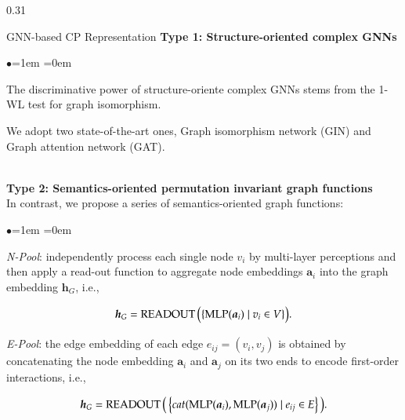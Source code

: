 \documentclass[serif,onlymath,final,xcolor=table]{beamer}
\begin{document}
\begin{frame}
\begin{columns}[t]
\begin{column}{0.31\linewidth}
\begin{block}{GNN-based CP Representation}
\textbf{Type 1: Structure-oriented complex GNNs}
\begin{list}{$\bullet$}{\leftmargin=1em \itemindent=0em}
\item The discriminative power of structure-oriente complex GNNs stems from the 1-WL test for graph isomorphism.
\item We adopt two state-of-the-art ones, Graph isomorphism network (GIN) and Graph attention network (GAT).
\end{list}
~\\
\textbf{Type 2: Semantics-oriented permutation invariant graph functions}\\
In contrast, we propose a series of semantics-oriented graph functions: 
\begin{list}{$\bullet$}{\leftmargin=1em \itemindent=0em}
    \item \textit{N-Pool}: independently process each single node $v_i$ by multi-layer perceptions and then apply a read-out function to aggregate node embeddings $\bm a_{i}$ into the graph embedding $\bm h_{G}$, i.e., 
    \begin{small}
    \begin{equation*}
    \setlength{\abovedisplayskip}{3pt}
    \setlength{\belowdisplayskip}{3pt}
    \bm h_{G}=\operatorname{READOUT}\Big( \{\operatorname{MLP}(\bm a_{i}) \mid v_i \in V \}\Big).
    \end{equation*}
    \end{small}
    \item \textit{E-Pool}: the edge embedding of each edge $e_{ij}=(v_i, v_j)$ is obtained by concatenating the node embedding $\bm a_{i}$ and $\bm a_{j}$ on its two ends to encode first-order interactions, i.e., 
    \begin{small}
    \begin{align*}
    \setlength{\abovedisplayskip}{3pt}
    \setlength{\belowdisplayskip}{3pt}
    \bm h_{G}=\operatorname{READOUT}\Big(\left\{cat ( \operatorname{MLP}(\bm a_{i}), \operatorname{MLP}(\bm a_{j}) ) \mid e_{ij} \in E\right\}\Big).
    \end{align*}
    \end{small}
    

\end{list}
\end{block}
\end{column}
\end{columns}
\end{frame}
\end{document}
